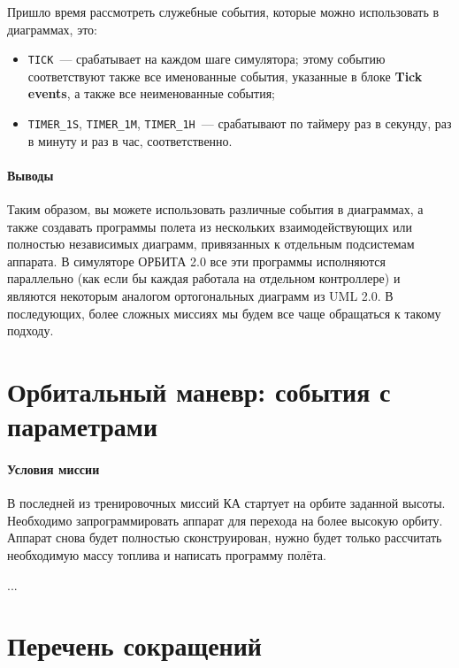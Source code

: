 \documentclass[12pt,a4paper]{article}
\begin{document}
Пришло время рассмотреть служебные события, которые можно использовать в диаграммах, это:

\begin{itemize}
\item \verb'TICK'~--- срабатывает на каждом шаге симулятора; этому событию соответствуют
  также все именованные события, указанные в блоке \textbf{Tick events}, а также все
  неименованные события;
\item \verb'TIMER_1S', \verb'TIMER_1M', \verb'TIMER_1H'~--- срабатывают по таймеру раз в
  секунду, раз в минуту и раз в час, соответственно.
\end{itemize}

\paragraph{Выводы} Таким образом, вы можете использовать различные события в диаграммах, а
также создавать программы полета из нескольких взаимодействующих или полностью независимых
диаграмм, привязанных к отдельным подсистемам аппарата. В симуляторе ОРБИТА 2.0 все эти
программы исполняются параллельно (как если бы каждая работала на отдельном контроллере) и
являются некоторым аналогом ортогональных диаграмм из UML 2.0. В последующих, более
сложных миссиях мы будем все чаще обращаться к такому подходу.

\clearpage
\section{Орбитальный маневр: события с параметрами}

\paragraph{Условия миссии} В последней из тренировочных миссий КА стартует на орбите
заданной высоты. Необходимо запрограммировать аппарат для перехода на более высокую
орбиту. Аппарат снова будет полностью сконструирован, нужно будет только рассчитать
необходимую массу топлива и написать программу полёта.

...

\section*{Перечень сокращений}
\end{document}
